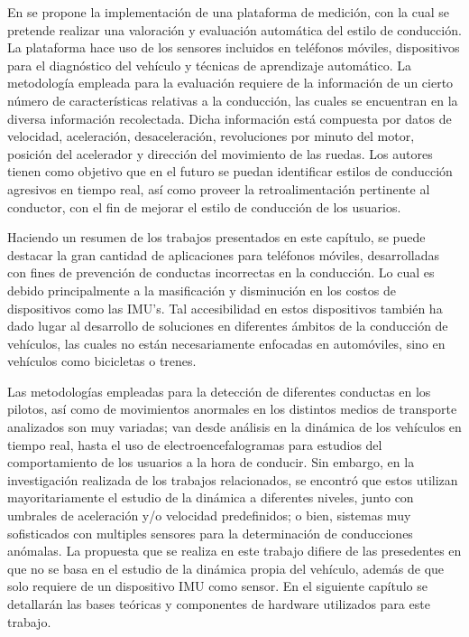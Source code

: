 En \cite{Hong:2014:SSP:2611222.2557321} se propone la implementación de una plataforma de medición, con la cual se pretende realizar una valoración y evaluación automática del estilo de conducción. 
La plataforma hace uso de los sensores incluidos en teléfonos móviles, dispositivos para el diagnóstico del vehículo y técnicas de aprendizaje automático. 
La metodología empleada para la evaluación requiere de la información de un cierto número de características relativas a la conducción, las cuales se encuentran en la diversa información recolectada. 
Dicha información está compuesta por datos de velocidad, aceleración, desaceleración, revoluciones por minuto del motor, posición del acelerador y dirección del movimiento de las ruedas. 
Los autores tienen como objetivo que en el futuro se puedan identificar estilos de conducción agresivos en tiempo real, así como proveer la retroalimentación pertinente al conductor, con el fin de mejorar el estilo de conducción de los usuarios. 

Haciendo un resumen de los trabajos presentados en este capítulo, se puede destacar la gran cantidad de aplicaciones para teléfonos móviles, desarrolladas con fines de prevención de conductas incorrectas en la conducción.
Lo cual es debido principalmente a la masificación y disminución en los costos de dispositivos como las IMU's.
Tal accesibilidad en estos dispositivos también ha dado lugar al desarrollo de soluciones en diferentes ámbitos de la conducción de vehículos, las cuales no están necesariamente enfocadas en automóviles, sino en vehículos como bicicletas o trenes.

Las metodologías empleadas para la detección de diferentes conductas en los pilotos, así como de movimientos anormales en los distintos medios de transporte analizados son muy variadas; van desde análisis en la dinámica de los vehículos en tiempo real, hasta el uso de electroencefalogramas para estudios del comportamiento de los usuarios a la hora de conducir.
Sin embargo, en la investigación realizada de los trabajos relacionados, se encontró que estos utilizan mayoritariamente el estudio de la dinámica a diferentes niveles, junto con umbrales de aceleración y/o velocidad predefinidos; o bien, sistemas muy sofisticados con multiples sensores para la determinación de conducciones anómalas.
La propuesta que se realiza en este trabajo difiere de las presedentes en que no se basa en el estudio de la dinámica propia del vehículo, además de que solo requiere de un dispositivo IMU como sensor.
En el siguiente capítulo se detallarán las bases teóricas y componentes de hardware utilizados para este trabajo.
